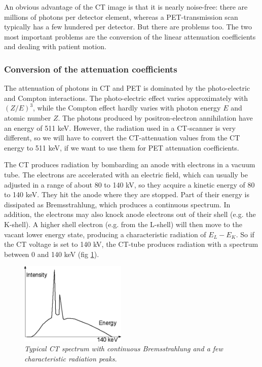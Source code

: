 \documentclass[11pt,oneside]{book}
\begin{document}
An obvious advantage of the CT image is that it is nearly noise-free:
there are millions of photons per detector element, whereas a
PET-transmission scan typically has a few hundered per detector. But
there are problems too. The two most important problems are the
conversion of the linear attenuation coefficients and dealing with
patient motion.

\subsubsection{Conversion of the attenuation coefficients}
The attenuation of photons in CT and PET is dominated by the photo-electric and
Compton interactions. The photo-electric effect varies approximately with
$(Z/E)^3$, while the Compton effect hardly varies with photon energy $E$ and
atomic number $Z$. The photons produced by positron-electron annihilation have
an energy of 511 keV. However, the radiation used in a CT-scanner is very
different, so we will have to convert the CT-attenuation values from the CT
energy to 511 keV, if we want to use them for PET attenuation coefficients.

The CT produces radiation by bombarding an anode with electrons in a vacuum
tube. The electrons are accelerated with an electric field, which can usually
be adjusted in a range of about 80 to 140 kV, so they acquire a kinetic energy
of 80 to 140 keV. They hit the anode where they are stopped. Part of their
energy is dissipated as Bremsstrahlung, which produces a continuous spectrum.
In addition, the electrons may also knock anode electrons out of their shell
(e.g. the K-shell). A higher shell electron (e.g. from the L-shell) will then
move to the vacant lower energy state, producing a characteristic radiation of
$E_L - E_K$. So if the CT voltage is set to 140 kV, the CT-tube produces
radiation with a spectrum between 0 and 140 keV (fig \ref{fig:ctspectrum}).
%
\begin{figure}[tbp]
\centering
\includegraphics[width=0.45\textwidth]{figs/fig_ctspectrum.pdf}
\caption{\label{fig:ctspectrum} \emph{Typical CT spectrum with continuous
Bremsstrahlung and a few characteristic radiation peaks.}}
\end{figure}
\end{document}
